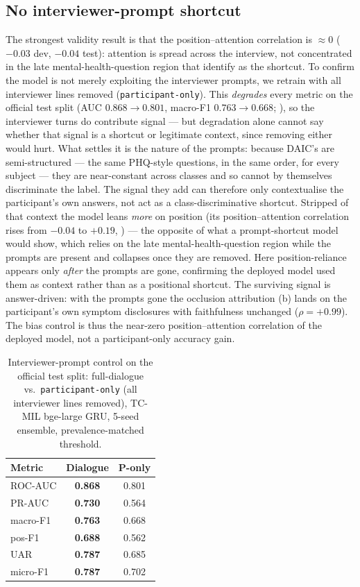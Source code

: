 \documentclass[conference]{IEEEtran}
\begin{document}
\subsection{No interviewer-prompt shortcut}
The strongest validity result is that the position--attention correlation is
$\approx$0 ($-0.03$ dev, $-0.04$ test): attention is spread across the
interview, not concentrated in the late mental-health-question region that
\cite{burdisso2024} identify as the shortcut. To confirm the model is not merely
exploiting the interviewer prompts, we retrain with all interviewer lines
removed (\texttt{participant-only}). This \emph{degrades} every metric on the
official test split (AUC $0.868\!\to\!0.801$, macro-F1 $0.763\!\to\!0.668$;
), so the interviewer turns do contribute signal --- but
degradation alone cannot say whether that signal is a shortcut or legitimate
context, since removing either would hurt. What settles it is the nature of the
prompts: because DAIC's are semi-structured --- the same PHQ-style questions, in
the same order, for every subject --- they are near-constant across classes and
so cannot by themselves discriminate the label. The signal they add can
therefore only contextualise the participant's own answers, not act as a
class-discriminative shortcut. Stripped of that context the model leans
\emph{more} on position (its position--attention correlation rises from $-0.04$
to $+0.19$, ) --- the opposite of what a prompt-shortcut model
would show, which relies on the late mental-health-question region while the
prompts are present and collapses once they are removed. Here position-reliance
appears only \emph{after} the prompts are gone, confirming the deployed model
used them as context rather than as a positional shortcut. The surviving signal is answer-driven: with the prompts gone the
occlusion attribution (b) lands on the participant's own symptom
disclosures with faithfulness unchanged ($\rho=+0.99$). The bias control is thus
the near-zero position--attention correlation of the deployed model, not a
participant-only accuracy gain.

\begin{table}[t]
\caption{Interviewer-prompt control on the official test split: full-dialogue
vs.\ \texttt{participant-only} (all interviewer lines removed), TC-MIL
bge-large GRU, 5-seed ensemble, prevalence-matched threshold.}
\label{tab:ponly}
\centering
\small
\begin{tabular}{@{}lcc@{}}
\toprule
\textbf{Metric} & \textbf{Dialogue} & \textbf{P-only} \\
\midrule
ROC-AUC       & \textbf{0.868} & 0.801 \\
PR-AUC        & \textbf{0.730} & 0.564 \\
macro-F1      & \textbf{0.763} & 0.668 \\
pos-F1        & \textbf{0.688} & 0.562 \\
UAR           & \textbf{0.787} & 0.685 \\
micro-F1      & \textbf{0.787} & 0.702 \\
\bottomrule
\end{tabular}
\end{table}
\end{document}
